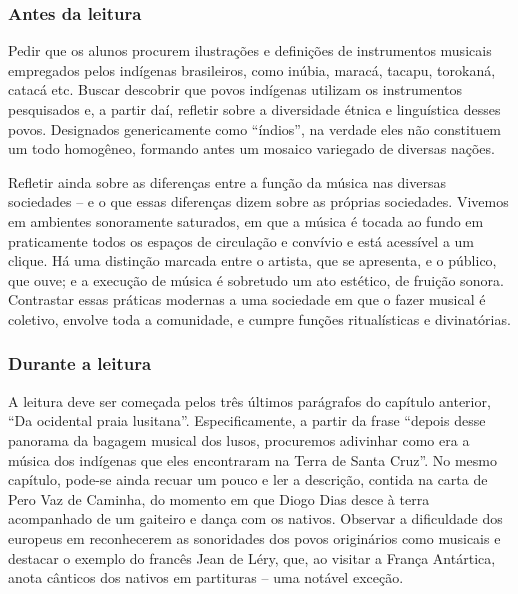 \documentclass[11pt]{extarticle}
\begin{document}


\subsubsection{Antes da leitura}

Pedir que os alunos procurem ilustrações e definições de instrumentos musicais
empregados pelos indígenas brasileiros, como inúbia, maracá, tacapu, torokaná,
catacá etc. Buscar descobrir que povos indígenas utilizam os instrumentos
pesquisados e, a partir daí, refletir sobre a diversidade étnica e linguística
desses povos. Designados genericamente como “índios”, na verdade eles não
constituem um todo homogêneo, formando antes um mosaico variegado de diversas
nações.


Refletir ainda sobre as diferenças entre a função da música nas diversas
sociedades – e o que essas diferenças dizem sobre as próprias sociedades.
Vivemos em ambientes sonoramente saturados, em que a música é tocada ao fundo
em praticamente todos os espaços de circulação e convívio e está acessível a
um clique. Há uma distinção marcada entre o artista, que se apresenta, e o
público, que ouve; e a execução de música é sobretudo um ato estético, de
fruição sonora. Contrastar essas práticas modernas a uma sociedade em que o
fazer musical é coletivo, envolve toda a comunidade, e cumpre funções
ritualísticas e divinatórias.

\subsubsection{Durante a leitura}

  A leitura deve ser começada pelos três últimos parágrafos do capítulo
anterior, ``Da ocidental praia lusitana''. Especificamente, a partir da frase
“depois desse panorama da bagagem musical dos lusos, procuremos adivinhar como
era a música dos indígenas que eles encontraram na Terra de Santa Cruz”. No
mesmo capítulo, pode-se ainda recuar um pouco e ler a descrição, contida na
carta de Pero Vaz de Caminha, do momento em que Diogo Dias desce à terra
acompanhado de um gaiteiro e dança com os nativos. Observar a dificuldade dos
europeus em reconhecerem as sonoridades dos povos originários como musicais e
destacar o exemplo do francês Jean de Léry, que, ao visitar a França Antártica,
anota cânticos dos nativos em partituras – uma notável exceção.
\end{document}

